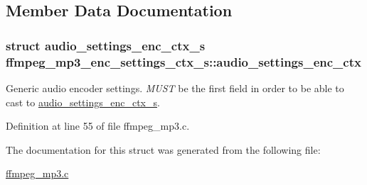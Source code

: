 \subsection{Member Data Documentation}
\subsubsection[{\texorpdfstring{audio\+\_\+settings\+\_\+enc\+\_\+ctx}{audio_settings_enc_ctx}}]{\setlength{\rightskip}{0pt plus 5cm}struct {\bf audio\+\_\+settings\+\_\+enc\+\_\+ctx\+\_\+s} ffmpeg\+\_\+mp3\+\_\+enc\+\_\+settings\+\_\+ctx\+\_\+s\+::audio\+\_\+settings\+\_\+enc\+\_\+ctx}\hypertarget{structffmpeg__mp3__enc__settings__ctx__s_a199ef797aa61bde0de50a9e09ed21f5c}{}\label{structffmpeg__mp3__enc__settings__ctx__s_a199ef797aa61bde0de50a9e09ed21f5c}
Generic audio encoder settings. {\itshape M\+U\+ST} be the first field in order to be able to cast to \hyperlink{structaudio__settings__enc__ctx__s}{audio\+\_\+settings\+\_\+enc\+\_\+ctx\+\_\+s}. 

Definition at line 55 of file ffmpeg\+\_\+mp3.\+c.



The documentation for this struct was generated from the following file\+:\begin{DoxyCompactItemize}
\item 
\hyperlink{ffmpeg__mp3_8c}{ffmpeg\+\_\+mp3.\+c}\end{DoxyCompactItemize}
